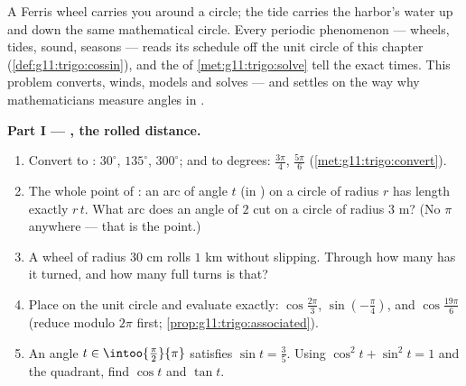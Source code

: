 \begin{problem}
\label{pb:g11:trigo:1}
A Ferris wheel carries you around a circle; the tide carries the
harbor's water up and down the same mathematical circle. Every
periodic phenomenon --- wheels, tides, sound, seasons --- reads
its schedule off the unit circle of this chapter
(\cref{def:g11:trigo:cossin}), and the  of
\cref{met:g11:trigo:solve} tell the exact times. This problem
converts, winds, models and solves --- and settles on the way why
mathematicians measure angles in .

\medskip
\noindent\textbf{Part I --- , the rolled distance.}
\begin{enumerate}
  \item Convert to : $30^\circ$, $135^\circ$,
        $300^\circ$; and to degrees: $\frac{3\pi}{4}$,
        $\frac{5\pi}{6}$ (\cref{met:g11:trigo:convert}).
  \item The whole point of : an arc of angle $t$ (in
        ) on a circle of radius $r$ has length exactly
        $r\,t$. What arc does an angle of $2$  cut on a
        circle of radius $3$ m? (No $\pi$ anywhere --- that is
        the point.)
  \item A wheel of radius $30$ cm rolls $1$ km without
        slipping. Through how many \emph{} has it turned,
        and how many full turns is that?
  \item Place on the unit circle and evaluate exactly:
        $\cos\frac{2\pi}{3}$, $\sin\left(-\frac{\pi}{4}\right)$,
        and $\cos\frac{19\pi}{6}$ (reduce modulo $2\pi$ first;
        \cref{prop:g11:trigo:associated}).
  \item An angle $t \in \intoo{\frac\pi2}{\pi}$ satisfies
        $\sin t = \frac35$. Using
        $\cos^2 t + \sin^2 t = 1$ and the quadrant, find
        $\cos t$ and $\tan t$.
\end{enumerate}


\end{problem}
